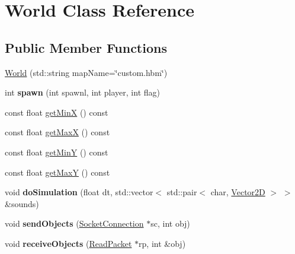 \hypertarget{class_world}{\section{World Class Reference}
\label{class_world}
}
\subsection*{Public Member Functions}
\begin{DoxyCompactItemize}
\item 
\hyperlink{class_world_a927865dd19c6a03b0d3b481ae03775c3}{World} (std\-::string map\-Name=\char`\"{}custom.\-hbm\char`\"{})
\item 
\hypertarget{class_world_af852886a613927fb0e1ca4b33a14f303}{int {\bfseries spawn} (int spawnl, int player, int flag)}\label{class_world_af852886a613927fb0e1ca4b33a14f303}

\item 
const float \hyperlink{class_world_a1780684e06f60af5a22bd232916860d8}{get\-Min\-X} () const 
\item 
const float \hyperlink{class_world_a1e35597fd94c241b9df7a87e9b6a523d}{get\-Max\-X} () const 
\item 
const float \hyperlink{class_world_a8ec2876af6bcbe4603c786eb67b040fd}{get\-Min\-Y} () const 
\item 
const float \hyperlink{class_world_a402581ee124acda99859c7e67edff1de}{get\-Max\-Y} () const 
\item 
\hypertarget{class_world_a587f1be5d3b3237a5c00714ec17e39a9}{void {\bfseries do\-Simulation} (float dt, std\-::vector$<$ std\-::pair$<$ char, \hyperlink{class_vector2_d}{Vector2\-D} $>$ $>$ \&sounds)}\label{class_world_a587f1be5d3b3237a5c00714ec17e39a9}

\item 
\hypertarget{class_world_ada6d1ec2f526a8529a709f5ce6fa2a0a}{void {\bfseries send\-Objects} (\hyperlink{class_socket_connection}{Socket\-Connection} $\ast$sc, int obj)}\label{class_world_ada6d1ec2f526a8529a709f5ce6fa2a0a}

\item 
\hypertarget{class_world_a2235107a1f2470dc270c2bfa3cf0ac51}{void {\bfseries receive\-Objects} (\hyperlink{class_read_packet}{Read\-Packet} $\ast$rp, int \&obj)}\label{class_world_a2235107a1f2470dc270c2bfa3cf0ac51}

\end{DoxyCompactItemize}
